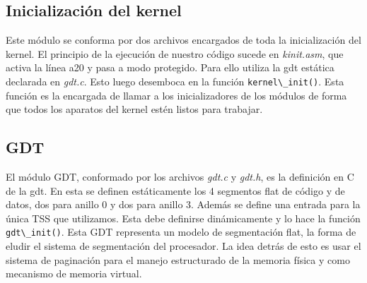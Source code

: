 \documentclass[a4paper]{article}
\newcommand{\file}[1]{\textit{#1}}
\newcommand{\func}[1]{\lstinline{#1}}
\begin{document}

\subsection{Inicialización del kernel}

Este módulo se conforma por dos archivos encargados de toda la inicialización del kernel. El principio de la ejecución de nuestro código sucede en \file{kinit.asm}, que activa la línea a20 y pasa a modo protegido. Para ello utiliza la gdt estática declarada en \file{gdt.c}. Esto luego desemboca en la función \func{kernel\_init()}. Esta función es la encargada de llamar a los inicializadores de los módulos de forma que todos los aparatos del kernel estén listos para trabajar.

\subsection{GDT}

El módulo GDT, conformado por los archivos \file{gdt.c} y \file{gdt.h}, es la definición en C de la gdt. En esta se definen estáticamente los 4 segmentos flat de código y de datos, dos para anillo 0 y dos para anillo 3. Además se define una entrada para la única TSS que utilizamos. Esta debe definirse dinámicamente y lo hace la función \func{gdt\_init()}. Esta GDT representa un modelo de segmentación flat, la forma de eludir el sistema de segmentación del procesador. La idea detrás de esto es usar el sistema de paginación para el manejo estructurado de la memoria física y como mecanismo de memoria virtual. 
\end{document}

